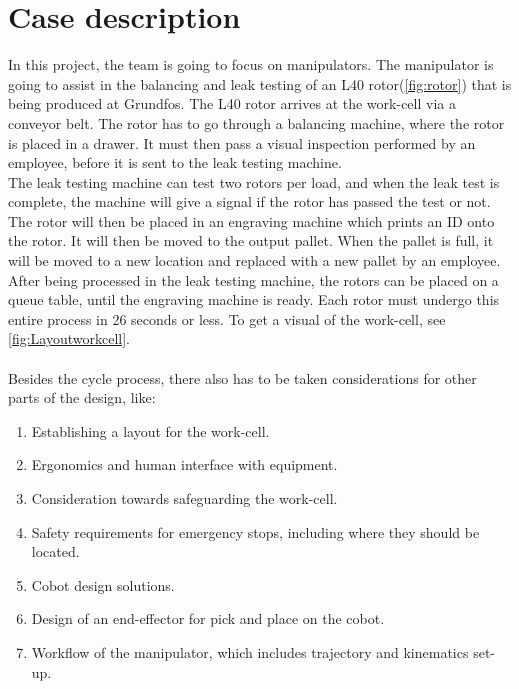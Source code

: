 \section{Case description} \label{ch:case description}

In this project, the team is going to focus on manipulators.
The manipulator is going to assist in the balancing and leak testing of an L40 rotor(\ref{fig:rotor}) that is being produced at Grundfos. The L40 rotor arrives at the work-cell via a conveyor belt. The rotor has to go through a balancing machine, where the rotor is placed in a drawer. It must then pass a visual inspection performed by an employee, before it is sent to the leak testing machine.\\
The leak testing machine can test two rotors per load, and when the leak test is complete, the machine will give a signal if the rotor has passed the test or not. The rotor will then be placed in an engraving machine which prints an ID onto the rotor. It will then be moved to the output pallet. When the pallet is full, it will be moved to a new location and replaced with a new pallet by an employee.\\ 
After being processed in the leak testing machine, the rotors can be placed on a queue table, until the engraving machine is ready. Each rotor must undergo this entire process in 26 seconds or less. To get a visual of the work-cell, see \ref{fig:Layoutworkcell}.\\
\\
Besides the cycle process, there also has to be taken considerations for other parts of the design, like:

\begin{enumerate} 
    \item Establishing a layout for the work-cell.
    \item Ergonomics and human interface with equipment.
    \item Consideration towards safeguarding the work-cell.
    \item Safety requirements for emergency stops, including where they should be located.
    \item Cobot design solutions. 
    \item Design of an end-effector for pick and place on the cobot.
    \item Workflow of the manipulator, which includes trajectory and kinematics set-up. 
\end{enumerate}

